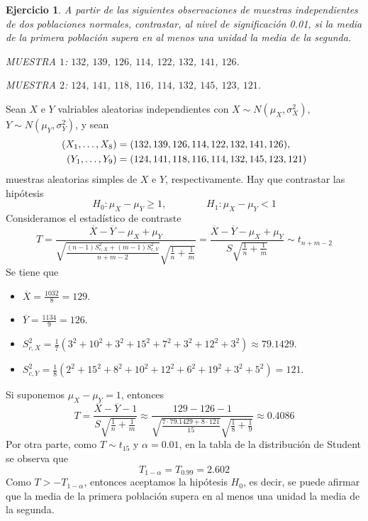 \documentclass[11pt]{report}
\makeatletter
\renewenvironment{proof}[1][\proofname]{\par
  \pushQED{\qed}%
  \normalfont \topsep\z@skip %
  \trivlist
  \item[\hskip\labelsep
        \itshape
    #1\@addpunct{.}]\ignorespaces
}{%
  \popQED\endtrivlist\@endpefalse
}
\newtheorem{ejercicio}{Ejercicio}
\makeatother
\begin{document}
\begin{ejercicio}
  A partir de las siguientes observaciones de muestras independientes de dos poblaciones normales, contrastar, al nivel de significación 0.01, si la media de la primera población supera en al menos una unidad la media de la segunda.

  MUESTRA $1$: $132$, $139$, $126$, $114$, $122$, $132$, $141$, $126$.

  MUESTRA $2$: $124$, $141$, $118$, $116$, $114$, $132$, $145$, $123$, $121$.
\end{ejercicio}

\begin{proof}
  Sean $X$ e $Y$ valriables aleatorias independientes con $X \sim N(\mu_X,\sigma_X^2)$, $Y \sim N(\mu_Y, \sigma_Y^2)$, y sean
  \[\begin{aligned}[t](X_1,\mathellipsis,X_8) &= (132, 139, 126, 114, 122, 132, 141, 126), \\
   (Y_1,\mathellipsis,Y_9) &= (124, 141, 118, 116, 114, 132, 145, 123, 121)
  \end{aligned}
    \]
  muestras aleatorias simples de $X$ e $Y$, respectivamente. Hay que contrastar las hipótesis
  \[H_0 \colon \mu_X-\mu_Y \geq 1, \qquad \qquad H_1 \colon \mu_X-\mu_Y < 1\]
  Consideramos el estadístico de contraste
  \[T = \frac{\overline{X}-\overline{Y}-\mu_X+\mu_Y}{\sqrt{\frac{(n-1)S^2_{c,X}+(m-1)S^2_{c,Y}}{n+m-2}}\sqrt{\frac{1}{n}+\frac{1}{m}}}= \frac{\overline{X}-\overline{Y}-\mu_X+\mu_Y}{S\sqrt{\frac{1}{n}+\frac{1}{m}}} \sim t_{n+m-2}\]
  Se tiene que
  \begin{itemize}
    \item $\displaystyle \overline{X} = \frac{1032}{8} = 129$.
    \item $\displaystyle \overline{Y} = \frac{1134}{9} = 126$.
    \item $\displaystyle S^2_{c,X}= \frac{1}{7}(3^2+10^2+3^2+15^2+7^2+3^2+12^2+3^2) \approx 79.1429$.
    \item $\displaystyle S^2_{c,Y}= \frac{1}{8}(2^2+15^2+8^2+10^2+12^2+6^2+19^2+3^2+5^2) = 121$.
  \end{itemize}
  Si suponemos $\mu_X-\mu_Y = 1$, entonces
  \[T = \frac{\overline{X}-\overline{Y}-1}{S\sqrt{\frac{1}{n}+\frac{1}{m}}} \approx \frac{129-126-1}{\sqrt{\frac{7\cdot 79.1429+8\cdot 121}{15}}\sqrt{\frac{1}{8}+\frac{1}{9}}} \approx  0.4086\]
  Por otra parte, como $T \sim t_{15}$ y $\alpha = 0.01$, en la tabla de la distribución de Student se observa que
  \[T_{1-\alpha} = T_{0.99} = 2.602\] 
  Como $T>-T_{1-\alpha}$, entonces aceptamos la hipótesis $H_0$, es decir, se puede afirmar que la media de la primera población supera en al menos una unidad la media de la segunda.
\end{proof}
\end{document}
